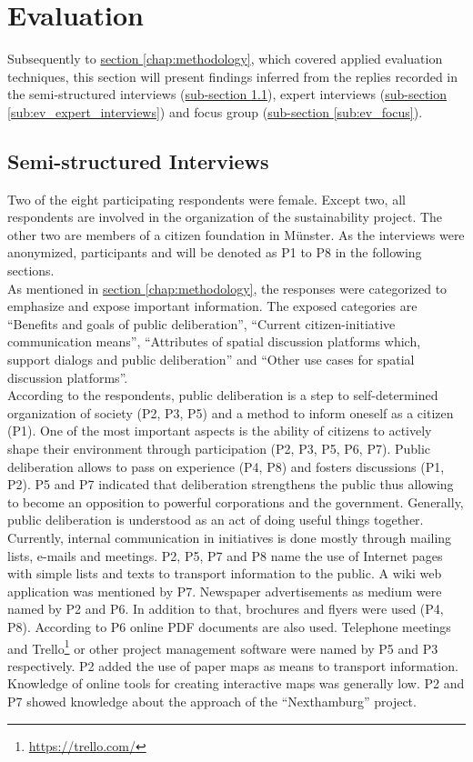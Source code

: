 \section{Evaluation}
\label{chap:evaluation}
Subsequently to \hyperref[chap:methodology]{section \ref{chap:methodology}}, which covered applied evaluation techniques, this section will present findings inferred from the replies recorded in the semi-structured interviews (\hyperref[sub:ev_interviews]{sub-section \ref{sub:ev_interviews}}), expert interviews (\hyperref[sub:ev_expert_interviews]{sub-section \ref{sub:ev_expert_interviews}}) and focus group (\hyperref[sub:ev_focus]{sub-section \ref{sub:ev_focus}}).

\subsection{Semi-structured Interviews}
\label{sub:ev_interviews}
Two of the eight participating respondents were female. Except two, all respondents are involved in the organization of the sustainability project. The other two are members of a citizen foundation in M{\"u}nster. As the interviews were anonymized, participants and will be denoted as P1 to P8 in the following sections.\\
As mentioned in \hyperref[chap:methodology]{section \ref{chap:methodology}}, the responses were categorized to emphasize and expose important information. The exposed categories are ``Benefits and goals of public deliberation'', ``Current citizen-initiative communication means'', ``Attributes of spatial discussion platforms which, support dialogs and public deliberation'' and ``Other use cases for spatial discussion platforms''.\\
According to the respondents, public deliberation is a step to self-determined organization of society (P2, P3, P5) and a method to inform oneself as a citizen (P1). One of the most important aspects is the ability of citizens to actively shape their environment through participation (P2, P3, P5, P6, P7). Public deliberation allows to pass on experience (P4, P8) and fosters discussions (P1, P2). P5 and P7 indicated that deliberation strengthens the public thus allowing to become an opposition to powerful corporations and the government. Generally, public deliberation is understood as an act of doing useful things together.\\
Currently, internal communication in initiatives is done mostly through mailing lists, e-mails and meetings. P2, P5, P7 and P8 name the use of Internet pages with simple lists and texts to transport information to the public. A wiki web application was mentioned by P7. Newspaper advertisements as medium were named by P2 and P6. In addition to that, brochures and flyers were used (P4, P8). According to P6 online PDF documents are also used. Telephone meetings and Trello\footnote{\url{https://trello.com/}} or other project management software were named by P5 and P3 respectively. P2 added the use of paper maps as means to transport information. Knowledge of online tools for creating interactive maps was generally low. P2 and P7 showed knowledge about the approach of the ``Nexthamburg'' project.\\
